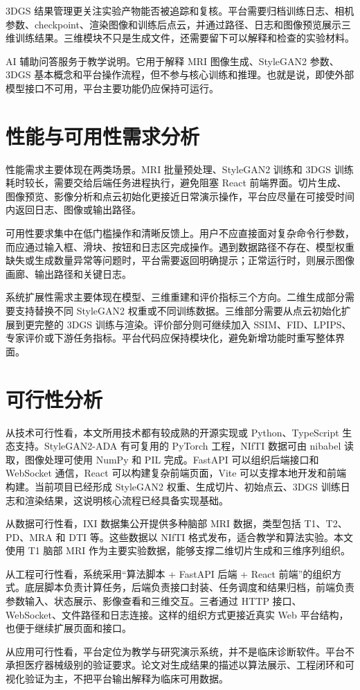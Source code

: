 3DGS 结果管理更关注实验产物能否被追踪和复核。平台需要归档训练日志、相机参数、checkpoint、渲染图像和训练后点云，并通过路径、日志和图像预览展示三维训练结果。三维模块不只是生成文件，还需要留下可以解释和检查的实验材料。

AI 辅助问答服务于教学说明。它用于解释 MRI 图像生成、StyleGAN2 参数、3DGS 基本概念和平台操作流程，但不参与核心训练和推理。也就是说，即使外部模型接口不可用，平台主要功能仍应保持可运行。

\section{性能与可用性需求分析}
性能需求主要体现在两类场景。MRI 批量预处理、StyleGAN2 训练和 3DGS 训练耗时较长，需要交给后端任务进程执行，避免阻塞 React 前端界面。切片生成、图像预览、影像分析和点云初始化更接近日常演示操作，平台应尽量在可接受时间内返回日志、图像或输出路径。

可用性要求集中在低门槛操作和清晰反馈上。用户不应直接面对复杂命令行参数，而应通过输入框、滑块、按钮和日志区完成操作。遇到数据路径不存在、模型权重缺失或生成数量异常等问题时，平台需要返回明确提示；正常运行时，则展示图像画廊、输出路径和关键日志。

系统扩展性需求主要体现在模型、三维重建和评价指标三个方向。二维生成部分需要支持替换不同 StyleGAN2 权重或不同训练数据。三维部分需要从点云初始化扩展到更完整的 3DGS 训练与渲染。评价部分则可继续加入 SSIM、FID、LPIPS、专家评价或下游任务指标。平台代码应保持模块化，避免新增功能时重写整体界面。

\section{可行性分析}
从技术可行性看，本文所用技术都有较成熟的开源实现或 Python、TypeScript 生态支持。StyleGAN2-ADA 有可复用的 PyTorch 工程，NIfTI 数据可由 nibabel 读取，图像处理可使用 NumPy 和 PIL 完成。FastAPI 可以组织后端接口和 WebSocket 通信，React 可以构建复杂前端页面，Vite 可以支撑本地开发和前端构建。当前项目已经形成 StyleGAN2 权重、生成切片、初始点云、3DGS 训练日志和渲染结果，这说明核心流程已经具备实现基础。

从数据可行性看，IXI 数据集公开提供多种脑部 MRI 数据，类型包括 T1、T2、PD、MRA 和 DTI 等。这些数据以 NIfTI 格式发布，适合教学和算法实验\cite{ixiDataset}。本文使用 T1 脑部 MRI 作为主要实验数据，能够支撑二维切片生成和三维序列组织。

从工程可行性看，系统采用“算法脚本 + FastAPI 后端 + React 前端”的组织方式。底层脚本负责计算任务，后端负责接口封装、任务调度和结果归档，前端负责参数输入、状态展示、影像查看和三维交互。三者通过 HTTP 接口、WebSocket、文件路径和日志连接。这样的组织方式更接近真实 Web 平台结构，也便于继续扩展页面和接口。

从应用可行性看，平台定位为教学与研究演示系统，并不是临床诊断软件。平台不承担医疗器械级别的验证要求。论文对生成结果的描述以算法展示、工程闭环和可视化验证为主，不把平台输出解释为临床可用数据。
